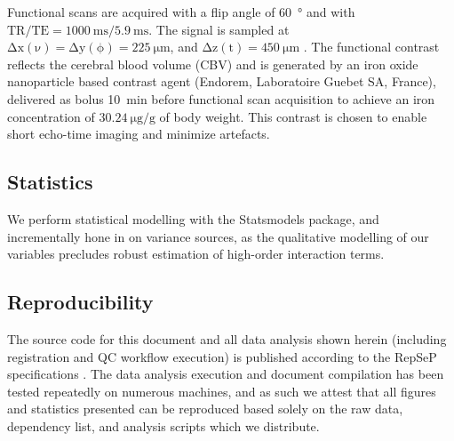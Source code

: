 Functional scans are acquired with a flip angle of \SI{60}{\degree} and with $\mathrm{TR/TE = \SI{1000}{\milli\second}/\SI{5.9}{\milli\second}}$.
The signal is sampled at $\mathrm{\Delta x(\nu)=\Delta y(\phi)=\SI{225}{\micro\meter}}$, and $\mathrm{\Delta z(t)=\SI{450}{\micro\meter}}$ .
The functional contrast reflects the cerebral blood volume (CBV) and is generated by an iron oxide nanoparticle based contrast agent (Endorem, Laboratoire Guebet SA, France), delivered as bolus \SI{10}{\minute} before functional scan acquisition to achieve an iron concentration of $\SI{30.24}{\micro\gram\per\gram}$ of body weight.
This contrast is chosen to enable short echo-time imaging and minimize artefacts.


\subsection{Statistics}
We perform statistical modelling with the Statsmodels \cite{statsmodels} package, and incrementally hone in on variance sources, as the qualitative modelling of our variables precludes robust estimation of high-order interaction terms.


\subsection{Reproducibility}

The source code for this document and all data analysis shown herein (including registration and QC workflow execution) is published according to the RepSeP specifications \cite{repsep}.
The data analysis execution and document compilation has been tested repeatedly on numerous machines, and as such we attest that all figures and statistics presented can be reproduced based solely on the raw data, dependency list, and analysis scripts which we distribute.
